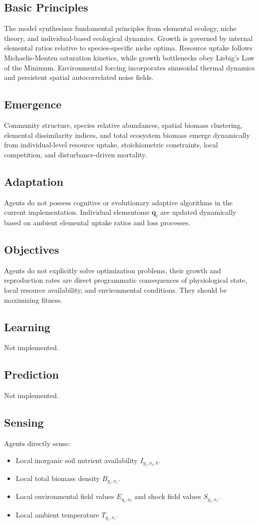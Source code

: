 \documentclass[11pt,a4paper]{article}
\begin{document}
\subsection{Basic Principles}
The model synthesizes fundamental principles from elemental ecology, niche theory, and individual-based ecological dynamics. Growth is governed by internal elemental ratios relative to species-specific niche optima. Resource uptake follows Michaelis-Menten saturation kinetics, while growth bottlenecks obey Liebig's Law of the Minimum. Environmental forcing incorporates sinusoidal thermal dynamics and persistent spatial autocorrelated noise fields.

\subsection{Emergence}
Community structure, species relative abundances, spatial biomass clustering, elemental dissimilarity indices, and total ecosystem biomass emerge dynamically from individual-level resource uptake, stoichiometric constraints, local competition, and disturbance-driven mortality.

\subsection{Adaptation}
Agents do not possess cognitive or evolutionary adaptive algorithms in the current implementation. Individual elementome $\boldsymbol{q}_i$ are updated dynamically based on ambient elemental uptake ratios and loss processes.

\subsection{Objectives}
Agents do not explicitly solve optimization problems, their growth and reproduction rates are direct programmatic consequences of physiological state, local resource availability, and environmental conditions. They should be maximizing fitness.

\subsection{Learning}
Not implemented.

\subsection{Prediction}
Not implemented.

\subsection{Sensing}
Agents directly sense:
\begin{itemize}
    \item Local inorganic soil nutrient availability $I_{y_i, x_i, k}$.
    \item Local total biomass density $B_{y_i, x_i}$.
    \item Local environmental field values $E_{y_i, x_i}$ and shock field values $S_{y_i, x_i}$.
    \item Local ambient temperature $T_{y_i, x_i}$.
\end{itemize}
\end{document}
